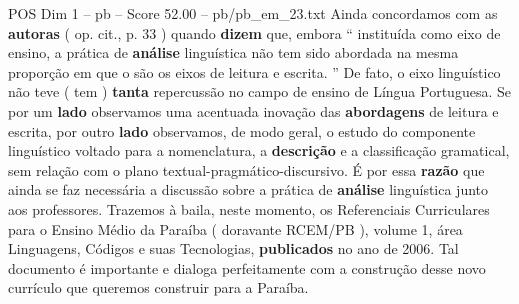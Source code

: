 \begin{textsample}{POS Dim 1 – pb – Score 52.00 – pb/pb\_em\_23.txt}
Ainda concordamos com as \textbf{autoras} ( op. cit., p. 33 ) quando \textbf{dizem} que, embora “ instituída como eixo de ensino, a prática de \textbf{análise} linguística não tem sido abordada na mesma proporção em que o são os eixos de leitura e escrita. ” De fato, o eixo linguístico não teve ( tem ) \textbf{tanta} repercussão no campo de ensino de Língua Portuguesa.
Se por um \textbf{lado} observamos uma acentuada inovação das \textbf{abordagens} de leitura e escrita, por outro \textbf{lado} observamos, de modo geral, o estudo do componente linguístico voltado para a nomenclatura, a \textbf{descrição} e a classificação gramatical, sem relação com o plano textual-pragmático-discursivo.
É por essa \textbf{razão} que ainda se faz necessária a discussão sobre a prática de \textbf{análise} linguística junto aos professores.
Trazemos à baila, neste momento, os Referenciais Curriculares para o Ensino Médio da Paraíba ( doravante RCEM/PB ), volume 1, área Linguagens, Códigos e suas Tecnologias, \textbf{publicados} no ano de 2006.
Tal documento é importante e dialoga perfeitamente com a construção desse novo currículo que queremos construir para a Paraíba.

\end{textsample}
